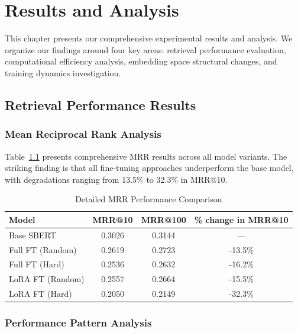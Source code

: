 \chapter{Results and Analysis} %

\label{Chapter5} %


This chapter presents our comprehensive experimental results and analysis. We organize our findings around four key areas: retrieval performance evaluation, computational efficiency analysis, embedding space structural changes, and training dynamics investigation.

\section{Retrieval Performance Results}

\subsection{Mean Reciprocal Rank Analysis}

Table~\ref{tab:mrr_detailed_thesis} presents comprehensive MRR results across all model variants. The striking finding is that all fine-tuning approaches underperform the base model, with degradations ranging from 13.5\% to 32.3\% in MRR@10.

\begin{table}[h]
\centering
\caption{Detailed MRR Performance Comparison}
\label{tab:mrr_detailed_thesis}
\begin{tabular}{lccc}
\toprule
Model & MRR@10 & MRR@100 & \% change in MRR@10 \\
\midrule
Base SBERT & 0.3026 & 0.3144 & — \\
Full FT (Random) & 0.2619 & 0.2723 & -13.5\% \\
Full FT (Hard) & 0.2536 & 0.2632 & -16.2\% \\
LoRA FT (Random) & 0.2557 & 0.2664 & -15.5\% \\
LoRA FT (Hard) & 0.2050 & 0.2149 & -32.3\% \\
\bottomrule
\end{tabular}
\end{table}

\subsection{Performance Pattern Analysis}

